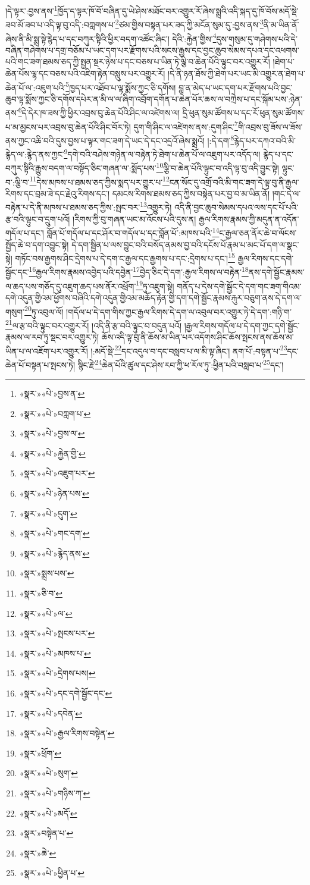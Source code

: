 །དེ་ལྟར་:བྱས་ནས་\footnote{«སྣར་»«པེ་»བྱས་ན་}ཁྱོད་ད་ལྟར་ཁོ་བོ་བཞིན་དུ་ཡེ་ཤེས་མཐོང་བར་འགྱུར་རོ་ཞེས་སྨྲའི་འདི་སྐད་དུ་ཁོ་བོས་མདོ་སྡེ་ཟབ་མོ་ཟབ་པ་འདི་ལྟ་བུ་འདི་:བཀླགས་པ་\footnote{«སྣར་»«པེ་»བཀླག་པ་}ཙམ་གྱིས་བསྟན་པར་ཟད་ཀྱི་མངོན་སུམ་དུ་:བྱས་ནས་\footnote{«སྣར་»«པེ་»བྱས་ལ་}ནི་མ་ཡིན་ནོ་ཞེས་ནི་མི་སྨྲ་སྟེ་རྙེད་པ་དང་བཀུར་སྟིའི་ཕྱིར་བདག་འཚོང་ཞིང་། དེའི་:རྐྱེན་གྱིས་\footnote{«སྣར་»«པེ་»རྐྱེན་གྱི་}དུས་གསུམ་དུ་གཤེགས་པའི་དེ་བཞིན་གཤེགས་པ་དགྲ་བཅོམ་པ་ཡང་དག་པར་རྫོགས་པའི་སངས་རྒྱས་དང་བྱང་ཆུབ་སེམས་དཔའ་དང་འཕགས་པའི་གང་ཟག་ཐམས་ཅད་ཀྱི་སྤྱན་སྔར་ཉེས་པ་དང་བཅས་པ་ཡིན་ཏེ་ལྕི་བ་ཆེན་པོའི་ལྟུང་བར་འགྱུར་རོ། །ཐེག་པ་ཆེན་པོས་ལྷ་དང་བཅས་པའི་འཇིག་རྟེན་བསླུས་པར་འགྱུར་རོ། །དེ་ནི་ཉན་ཐོས་ཀྱི་ཐེག་པར་ཡང་མི་འགྱུར་ན་ཐེག་པ་ཆེན་པོ་ལ་:འཇུག་པའི་\footnote{«སྣར་»«པེ་»འཇུག་པར་}ཁྱད་པར་འཐོབ་པ་ལྟ་སྨོས་ཀྱང་ཅི་དགོས། བླ་ན་མེད་པ་ཡང་དག་པར་རྫོགས་པའི་བྱང་ཆུབ་ལྟ་སྨོས་ཀྱང་ཅི་དགོས་དཔེར་ན་མི་ལ་ལ་ཞིག་འབྲོག་དགོན་པ་ཆེན་པོར་ཆས་ལ་བཀྲེས་པ་དང་སྐོམ་པས་:ཉེན་ནས་\footnote{«སྣར་»«པེ་»ཉེན་པས་}དེ་དེར་ཁ་ཟས་ཀྱི་ཕྱིར་འབྲས་བུ་ཆེན་པོའི་ཤིང་ལ་འཛེགས་ལ། དྲི་ཕུན་སུམ་ཚོགས་པ་དང་རོ་ཕུན་སུམ་ཚོགས་པ་མ་མྱངས་པར་འབྲས་བུ་ཆེན་པོའི་ཤིང་བོར་ཏེ། དུག་གི་ཤིང་ལ་འཛེགས་ནས་:དུག་ཤིང་\footnote{«སྣར་»«པེ་»དུག་}གི་འབྲས་བུ་ཟོས་ལ་ཟོས་ནས་ཀྱང་འཆི་བའི་དུས་བྱས་པ་ལྟར་གང་ཟག་དེ་ཡང་དེ་དང་འདྲའོ་ཞེས་སྨྲའོ། །:དེ་དག་\footnote{«སྣར་»«པེ་»གང་དག་}རྙེད་པར་དཀའ་བའི་མི་རྙེད་ལ་:རྙེད་ནས་ཀྱང་\footnote{«སྣར་»«པེ་»རྙེད་ནས་}དགེ་བའི་བཤེས་གཉེན་ལ་བརྟེན་ཏེ་ཐེག་པ་ཆེན་པོ་ལ་འཇུག་པར་འདོད་ལ། རྙེད་པ་དང་བཀུར་སྟིའི་རྒྱུས་བདག་ལ་བསྟོད་ཅིང་གཞན་ལ་:སྨོད་པས་\footnote{«སྣར་»སྨྲས་པས་}ལྕི་བ་ཆེན་པོའི་ལྟུང་བ་འདི་ལྟ་བུ་འདི་བྱུང་སྟེ། ལྟུང་བ་:ལྕི་བ་\footnote{«སྣར་»ཅི་བ་}དེས་མཁས་པ་ཐམས་ཅད་ཀྱིས་སྨད་པར་གྱུར་པ་\footnote{«སྣར་»«པེ་»ལ་}ངན་སོང་དུ་འགྲོ་བའི་མི་གང་ཟག་དེ་ལྟ་བུ་ནི་རྒྱལ་རིགས་དང་བྲམ་ཟེ་དང་རྗེའུ་རིགས་དང་། དམངས་རིགས་ཐམས་ཅད་ཀྱིས་བསྟེན་པར་བྱ་བ་མ་ཡིན་ནོ། །གང་དེ་ལ་བརྟེན་པ་དེ་ནི་མཁས་པ་ཐམས་ཅད་ཀྱིས་:སྤང་བར་\footnote{«སྣར་»«པེ་»སྤངས་པར་}འགྱུར་ཏེ། འདི་ནི་བྱང་ཆུབ་སེམས་དཔའ་ལས་དང་པོ་པའི་རྩ་བའི་ལྟུང་བ་དྲུག་པའོ། །རིགས་ཀྱི་བུ་གཞན་ཡང་མ་འོངས་པའི་དུས་ན། རྒྱལ་རིགས་རྣམས་ཀྱི་མདུན་ན་འདོན་གདོལ་པ་དང་། བློན་པོ་གདོལ་པ་དང་ཤོར་བ་གདོལ་པ་དང་བློན་པོ་:མཁས་པའི་\footnote{«སྣར་»«པེ་»མཁས་པ་}ང་རྒྱལ་ཅན་ནོར་ཆེ་བ་ལོངས་སྤྱོད་ཆེ་བ་དག་འབྱུང་སྟེ། དེ་དག་སྦྱིན་པ་ལས་བྱུང་བའི་བསོད་ནམས་བྱ་བའི་དངོས་པོ་རྣམ་པ་མང་པོ་དག་ལ་སྣང་སྟེ། གཏོང་བས་རྒྱགས་ཤིང་དྲེགས་པ་དེ་དག་ང་རྒྱལ་དང་རྒྱགས་པ་དང་:དྲེགས་པ་དང་།\footnote{«སྣར་»«པེ་»དྲེགས་པས།} རྒྱལ་རིགས་དང་དགེ་སྦྱོང་དང་\footnote{«སྣར་»«པེ་»དང་དགེ་སྦྱོང་དང་}རྒྱལ་རིགས་རྣམས་འབྱེད་པའི་དབྱེན་\footnote{«སྣར་»«པེ་»དབེན་}བྱེད་ཅིང་དེ་དག་:རྒྱལ་རིགས་ལ་བརྟེན་\footnote{«སྣར་»«པེ་»རྒྱལ་རིགས་བསྟེན་}ནས་དགེ་སྦྱོང་རྣམས་ལ་ཆད་པས་གཅོད་དུ་འཇུག་ཆད་པས་ནོར་འཕྲོག་\footnote{«སྣར་»ཕྲོག་}ཏུ་འཇུག་སྟེ། གནོད་པ་དེས་དགེ་སྦྱོང་དེ་དག་གང་ཟག་གིའམ་དགེ་འདུན་གྱིའམ་ཕྱོགས་བཞིའི་དགེ་འདུན་གྱིའམ་མཆོད་རྟེན་གྱི་དག་དགེ་སྦྱོང་རྣམས་རྐུར་བཅུག་ནས་དེ་དག་ལ་གསུག་\footnote{«སྣར་»«པེ་»སུག་}ཏུ་འབུལ་ལོ། །གདོལ་པ་དེ་དག་གིས་ཀྱང་རྒྱལ་རིགས་དེ་དག་ལ་འབུལ་བར་འགྱུར་ཏེ་དེ་དག་:གཉི་ག་\footnote{«སྣར་»«པེ་»གཉིས་ཀ་}ལ་རྩ་བའི་ལྟུང་བར་འགྱུར་རོ། །འདི་ནི་རྩ་བའི་ལྟུང་བ་བདུན་པའོ། །རྒྱལ་རིགས་གདོལ་པ་དེ་དག་ཀྱང་དགེ་སྦྱོང་རྣམས་ལ་རབ་ཏུ་སྡང་བར་འགྱུར་ཏེ། ཆོས་འདི་ལྟ་བུ་ནི་ཆོས་མ་ཡིན་པར་འདོགས་ཤིང་ཆོས་སྤངས་ནས་ཆོས་མ་ཡིན་པ་ལ་འཇོག་པར་འགྱུར་རོ། །:མདོ་སྡེ་\footnote{«སྣར་»«པེ་»མདོ་}དང་འདུལ་བ་དང་བསླབ་པ་ལ་མི་ལྟ་ཞིང་། ནག་པོ་:བསྟན་པ་\footnote{«སྣར་»བསྟེན་པ་}དང་ཆེན་པོ་བསྟན་པ་སྤངས་ཏེ། སྙིང་རྗེ་\footnote{«སྣར་»ཆེ་}ཆེན་པོའི་ཚུལ་དང་ཤེས་རབ་ཀྱི་ཕ་རོལ་ཏུ་:ཕྱིན་པའི་བསླབ་པ་\footnote{«སྣར་»«པེ་»ཕྱིན་པ་}དང་། 